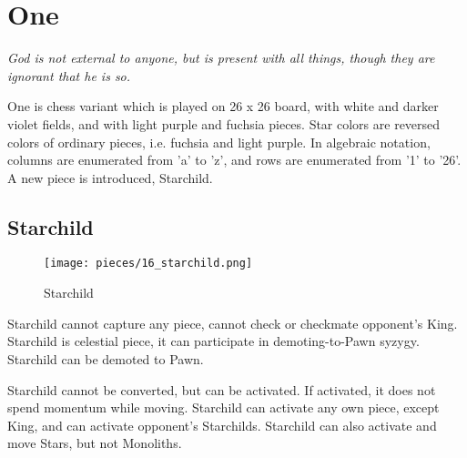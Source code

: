 

\chapter*{One}

\begin{flushright}
\parbox{0.8\textwidth}{
\emph{God is not external to anyone, but is present with all things, though
they are ignorant that he is so. \\
 } }
\end{flushright}

\noindent
One is chess variant which is played on 26 x 26 board, with white and
darker violet fields, and with light purple and fuchsia pieces. Star
colors are reversed colors of ordinary pieces, i.e. fuchsia and light
purple. In algebraic notation, columns are enumerated from 'a' to 'z',
and rows are enumerated from '1' to '26'. A new piece is introduced,
Starchild.

\clearpage %

\section*{Starchild}

\noindent
\begin{wrapfigure}[11]{l}{0.4\textwidth}
\centering
\texttt{[image: pieces/16\_starchild.png]}
\caption{Starchild}
\label{fig:16_starchild}
\end{wrapfigure}
Starchild cannot capture any piece, cannot check or checkmate opponent's King.
Starchild is celestial piece, it can participate in demoting-to-Pawn syzygy.
Starchild can be demoted to Pawn.

Starchild cannot be converted, but can be activated. If activated, it does not spend
momentum while moving. Starchild can activate any own piece, except King, and can
activate opponent's Starchilds. Starchild can also activate and move Stars, but not
Monoliths.

